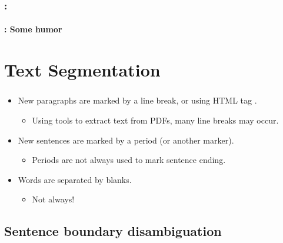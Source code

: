 \documentclass[xcolor=table]{beamer}
\begin{document}
\begin{frame}
	\frametitle{\insertshortsubtitle: \insertsection}
	\framesubtitle{\insertsubsection: Some humor}

	\begin{center}
	\end{center}

\end{frame}

\section{Text Segmentation}

\begin{frame}
	\frametitle{\insertshortsubtitle}
	\framesubtitle{\insertsection}

	\begin{itemize}
		\item New paragraphs are marked by a line break, or using HTML tag .
		\begin{itemize}
			\item Using tools to extract text from PDFs, many line breaks may occur. 
		\end{itemize}
		\item New sentences are marked by a period (or another marker).
		\begin{itemize}
			\item Periods are not always used to mark sentence ending.
		\end{itemize}
		\item Words are separated by blanks.
		\begin{itemize}
			\item Not always!
		\end{itemize}
	\end{itemize}

\end{frame}

\subsection{Sentence boundary disambiguation}
\end{document}
